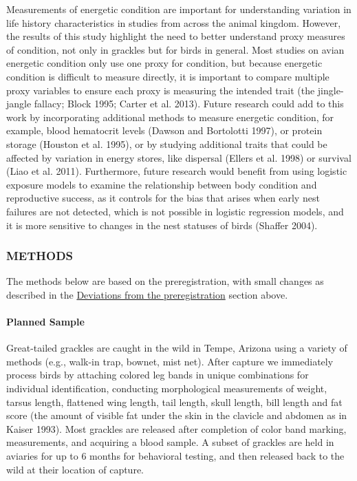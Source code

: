 \documentclass[
]{article}
\begin{document}
Measurements of energetic condition are important for understanding
variation in life history characteristics in studies from across the
animal kingdom. However, the results of this study highlight the need to
better understand proxy measures of condition, not only in grackles but
for birds in general. Most studies on avian energetic condition only use
one proxy for condition, but because energetic condition is difficult to
measure directly, it is important to compare multiple proxy variables to
ensure each proxy is measuring the intended trait (the jingle-jangle
fallacy; Block 1995; Carter et al. 2013). Future research could add to
this work by incorporating additional methods to measure energetic
condition, for example, blood hematocrit levels (Dawson and Bortolotti
1997), or protein storage (Houston et al. 1995), or by studying
additional traits that could be affected by variation in energy stores,
like dispersal (Ellers et al. 1998) or survival (Liao et al. 2011).
Furthermore, future research would benefit from using logistic exposure
models to examine the relationship between body condition and
reproductive success, as it controls for the bias that arises when early
nest failures are not detected, which is not possible in logistic
regression models, and it is more sensitive to changes in the nest
statuses of birds (Shaffer 2004).

\hypertarget{methods}{%
\subsubsection{METHODS}\label{methods}}

The methods below are based on the preregistration, with small changes
as described in the
\protect\hyperlink{deviations-from-the-preregistration}{Deviations from
the preregistration} section above.

\hypertarget{planned-sample}{%
\paragraph{\texorpdfstring{\textbf{Planned
Sample}}{Planned Sample}}\label{planned-sample}}

Great-tailed grackles are caught in the wild in Tempe, Arizona using a
variety of methods (e.g., walk-in trap, bownet, mist net). After capture
we immediately process birds by attaching colored leg bands in unique
combinations for individual identification, conducting morphological
measurements of weight, tarsus length, flattened wing length, tail
length, skull length, bill length and fat score (the amount of visible
fat under the skin in the clavicle and abdomen as in Kaiser 1993). Most
grackles are released after completion of color band marking,
measurements, and acquiring a blood sample. A subset of grackles are
held in aviaries for up to 6 months for behavioral testing, and then
released back to the wild at their location of capture.
\end{document}
